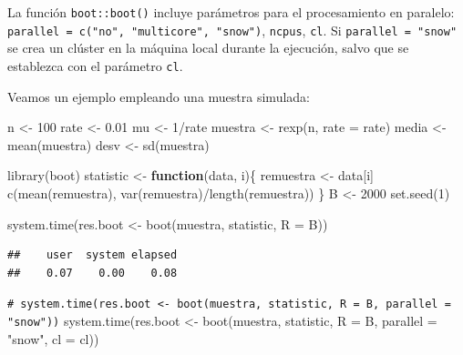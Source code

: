 \documentclass[
]{book}
\newenvironment{Shaded}{\begin{snugshade}}{\end{snugshade}}
\newcommand{\AttributeTok}[1]{\textcolor[rgb]{0.77,0.63,0.00}{#1}}
\newcommand{\CommentTok}[1]{\textcolor[rgb]{0.56,0.35,0.01}{\textit{#1}}}
\newcommand{\ControlFlowTok}[1]{\textcolor[rgb]{0.13,0.29,0.53}{\textbf{#1}}}
\newcommand{\DecValTok}[1]{\textcolor[rgb]{0.00,0.00,0.81}{#1}}
\newcommand{\FloatTok}[1]{\textcolor[rgb]{0.00,0.00,0.81}{#1}}
\newcommand{\FunctionTok}[1]{\textcolor[rgb]{0.00,0.00,0.00}{#1}}
\newcommand{\NormalTok}[1]{#1}
\newcommand{\OtherTok}[1]{\textcolor[rgb]{0.56,0.35,0.01}{#1}}
\newcommand{\SpecialCharTok}[1]{\textcolor[rgb]{0.00,0.00,0.00}{#1}}
\newcommand{\StringTok}[1]{\textcolor[rgb]{0.31,0.60,0.02}{#1}}
\theoremstyle{break}
\theoremstyle{nonumberplain}
\renewcommand{\CommentTok}[1]{\textcolor[rgb]{0.41,0.41,0.41}{\texttt{#1}}}
\begin{document}
La función \texttt{boot::boot()} incluye parámetros para el procesamiento en paralelo:
\texttt{parallel\ =\ c("no",\ "multicore",\ "snow")}, \texttt{ncpus}, \texttt{cl}.
Si \texttt{parallel\ =\ "snow"} se crea un clúster en la máquina local durante la ejecución, salvo que se establezca con el parámetro \texttt{cl}.

Veamos un ejemplo empleando una muestra simulada:

\begin{Shaded}
\begin{Highlighting}[]
\NormalTok{n }\OtherTok{\textless{}{-}} \DecValTok{100}
\NormalTok{rate }\OtherTok{\textless{}{-}} \FloatTok{0.01}
\NormalTok{mu }\OtherTok{\textless{}{-}} \DecValTok{1}\SpecialCharTok{/}\NormalTok{rate}
\NormalTok{muestra }\OtherTok{\textless{}{-}} \FunctionTok{rexp}\NormalTok{(n, }\AttributeTok{rate =}\NormalTok{ rate)}
\NormalTok{media }\OtherTok{\textless{}{-}} \FunctionTok{mean}\NormalTok{(muestra)}
\NormalTok{desv }\OtherTok{\textless{}{-}} \FunctionTok{sd}\NormalTok{(muestra)}

\FunctionTok{library}\NormalTok{(boot)}
\NormalTok{statistic }\OtherTok{\textless{}{-}} \ControlFlowTok{function}\NormalTok{(data, i)\{}
\NormalTok{  remuestra }\OtherTok{\textless{}{-}}\NormalTok{ data[i]}
  \FunctionTok{c}\NormalTok{(}\FunctionTok{mean}\NormalTok{(remuestra), }\FunctionTok{var}\NormalTok{(remuestra)}\SpecialCharTok{/}\FunctionTok{length}\NormalTok{(remuestra))}
\NormalTok{\}}
\NormalTok{B }\OtherTok{\textless{}{-}} \DecValTok{2000}
\FunctionTok{set.seed}\NormalTok{(}\DecValTok{1}\NormalTok{)}

\FunctionTok{system.time}\NormalTok{(res.boot }\OtherTok{\textless{}{-}} \FunctionTok{boot}\NormalTok{(muestra, statistic, }\AttributeTok{R =}\NormalTok{ B))}
\end{Highlighting}
\end{Shaded}

\begin{verbatim}
##    user  system elapsed 
##    0.07    0.00    0.08
\end{verbatim}

\begin{Shaded}
\begin{Highlighting}[]
\CommentTok{\# system.time(res.boot \textless{}{-} boot(muestra, statistic, R = B, parallel = "snow"))}
\FunctionTok{system.time}\NormalTok{(res.boot }\OtherTok{\textless{}{-}} \FunctionTok{boot}\NormalTok{(muestra, statistic, }\AttributeTok{R =}\NormalTok{ B, }\AttributeTok{parallel =} \StringTok{"snow"}\NormalTok{, }\AttributeTok{cl =}\NormalTok{ cl))}
\end{Highlighting}
\end{Shaded}
\end{document}
